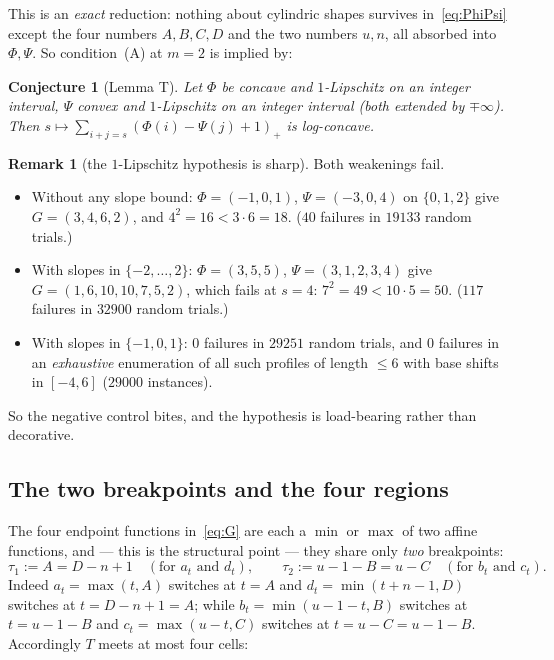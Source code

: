 \documentclass[11pt]{article}
\theoremstyle{plain}
\newtheorem{conjecture}[theorem]{Conjecture}
\theoremstyle{definition}
\newtheorem{remark}[theorem]{Remark}
\begin{document}
This is an \emph{exact} reduction: nothing about cylindric shapes survives
in~\eqref{eq:PhiPsi} except the four numbers $A,B,C,D$ and the two numbers $u,n$, all
absorbed into $\Phi,\Psi$. So condition~(A) at $m=2$ is implied by:

\begin{conjecture}[Lemma T]\label{conj:T}
Let $\Phi$ be concave and $1$-Lipschitz on an integer interval, $\Psi$ convex and
$1$-Lipschitz on an integer interval (both extended by $\mp\infty$). Then
$s\mapsto\sum_{i+j=s}(\Phi(i)-\Psi(j)+1)_+$ is log-concave.
\end{conjecture}

\begin{remark}[the $1$-Lipschitz hypothesis is sharp]\label{rem:sharp}
Both weakenings fail.
\begin{itemize}
\item Without any slope bound: $\Phi=(-1,0,1)$, $\Psi=(-3,0,4)$ on $\{0,1,2\}$ give
$G=(3,4,6,2)$, and $4^2=16<3\cdot6=18$. ($40$ failures in $19133$ random trials.)
\item With slopes in $\{-2,\dots,2\}$: $\Phi=(3,5,5)$, $\Psi=(3,1,2,3,4)$ give
$G=(1,6,10,10,7,5,2)$, which fails at $s=4$: $7^2=49<10\cdot5=50$.
($117$ failures in $32900$ random trials.)
\item With slopes in $\{-1,0,1\}$: $0$ failures in $29251$ random trials, and $0$ failures
in an \emph{exhaustive} enumeration of all such profiles of length $\le6$ with base shifts
in $[-4,6]$ ($29000$ instances).
\end{itemize}
So the negative control bites, and the hypothesis is load-bearing rather than decorative.
\end{remark}

\subsection{The two breakpoints and the four regions}

The four endpoint functions in~\eqref{eq:G} are each a $\min$ or $\max$ of two affine
functions, and --- this is the structural point --- they share only \emph{two} breakpoints:
\[
  \tau_1:=A=D-n+1 \quad(\text{for }a_t\text{ and }d_t),
  \qquad
  \tau_2:=u-1-B=u-C \quad(\text{for }b_t\text{ and }c_t).
\]
Indeed $a_t=\max(t,A)$ switches at $t=A$ and $d_t=\min(t+n-1,D)$ switches at
$t=D-n+1=A$; while $b_t=\min(u-1-t,B)$ switches at $t=u-1-B$ and $c_t=\max(u-t,C)$
switches at $t=u-C=u-1-B$. Accordingly $T$ meets at most four cells:
\end{document}
